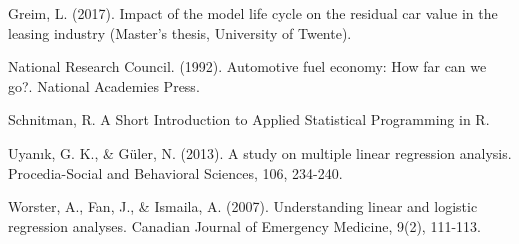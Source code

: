 \documentclass[
]{article}
\begin{document}
Greim, L. (2017). Impact of the model life cycle on the residual car
value in the leasing industry (Master's thesis, University of Twente).

National Research Council. (1992). Automotive fuel economy: How far can
we go?. National Academies Press.

Schnitman, R. A Short Introduction to Applied Statistical Programming in
R.

Uyanık, G. K., \& Güler, N. (2013). A study on multiple linear
regression analysis. Procedia-Social and Behavioral Sciences, 106,
234-240.

Worster, A., Fan, J., \& Ismaila, A. (2007). Understanding linear and
logistic regression analyses. Canadian Journal of Emergency Medicine,
9(2), 111-113.
\end{document}
